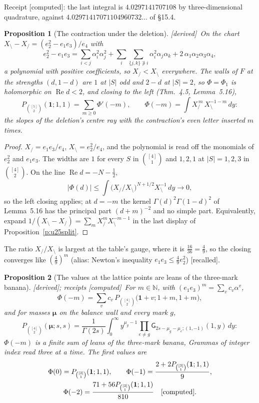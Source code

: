 \documentclass[11pt]{article}
\newcommand{\one}{\mathbf 1}
\newcommand{\bmu}{\boldsymbol\mu}
\newcommand{\sG}{\mathsf G}
\DeclareMathOperator{\re}{Re}
\theoremstyle{plain}
\newtheorem{proposition}{Proposition}[section]
\theoremstyle{definition}
\theoremstyle{remark}
\newcommand{\derived}{\textup{[derived]}}
\newcommand{\computed}{\textup{[computed]}}
\newcommand{\recalled}{\textup{[recalled]}}
\begin{document}
\noindent Receipt \computed: the last integral is $4.0297141707108$ by three-dimensional quadrature, against $4.02971417071104960732\ldots$ of \S15.4.

\begin{proposition}[The contraction under the deletion]\label{p:under}\derived\
On the chart $X_{\setminus}-X_{/}=(e_2^2-e_1e_3)/e_4$ with
\[
e_2^2-e_1e_3=\sum_{i<j}\alpha_i^2\alpha_j^2+\sum_i\sum_{\{j,k\}\not\ni i}\alpha_i^2\alpha_j\alpha_k+2\,\alpha_1\alpha_2\alpha_3\alpha_4,
\]
a polynomial with positive coefficients, so $X_{/}<X_{\setminus}$ everywhere. The walls of $F$ at the strengths $(d,1-d)$ are $1$ at $|S|$ odd and $2-d$ at $|S|=2$, so $\Phi=\Phi_1$ is holomorphic on $\re d<2$, and closing to the left (Thm.~4.5, Lemma~5.16),
\[
P_{\binom{[5]}2}(\one;1,1)=\sum_{m\ge0}\Phi'(-m),\qquad \Phi(-m)=\int X_{/}^{\,m}\,X_{\setminus}^{-1-m}\,dy :
\]
the slopes of the deletion's centre ray with the contraction's even letter inserted $m$ times.
\end{proposition}

\begin{proof}
$X_{/}=e_1e_3/e_4$, $X_{\setminus}=e_2^2/e_4$, and the polynomial is read off the monomials of $e_2^2$ and $e_1e_3$. The widths are $1$ for every $S$ in $\binom{[4]}1$ and $1,2,1$ at $|S|=1,2,3$ in $\binom{[4]}2$. On the line $\re d=-N-\frac12$,
\[
|\Phi(d)|\le\int\big(X_{/}/X_{\setminus}\big)^{N+1/2}X_{\setminus}^{-1}\,dy\to0,
\]
so the left closing applies; at $d=-m$ the kernel $\Gamma(d)^2\Gamma(1-d)^2$ of Lemma~5.16 has the principal part $(d+m)^{-2}$ and no simple part. Equivalently, expand $1/(X_{\setminus}-X_{/})=\sum_mX_{/}^mX_{\setminus}^{-m-1}$ in the last display of Proposition~\ref{p:u25split}.
\end{proof}

The ratio $X_{/}/X_{\setminus}$ is largest at the table's gauge, where it is $\frac{16}{36}=\frac49$, so the closing converges like $(\frac49)^m$ (alias: Newton's inequality $e_1e_3\le\frac49e_2^2$) \recalled.

\begin{proposition}[The values at the lattice points are leans of the three-mark banana]\label{p:leans}\derived; receipts \computed\
For $m\in\mathbb N$, with $(e_1e_3)^m=\sum_vc_v\alpha^v$,
\[
\Phi(-m)=\sum_vc_v\,P_{\binom{[4]}2}\big(\one+v;1+m,1+m\big),
\]
and for masses $\bmu$ on the balance wall and every mark $g$,
\[
P_{\binom{[4]}2}(\bmu;s,s)=\frac1{\Gamma(2s)}\int_0^\infty y^{\mu_g-1}\prod_{e\neq g}\sG_{2s-\mu_g-\mu_e;(1,-1)}(1,y)\,dy :
\]
$\Phi(-m)$ is a finite sum of leans of the three-mark banana, Grammas of integer index read three at a time. The first values are
\begin{gather*}
\Phi(0)=P_{\binom{[3]}1}(\one;1,1),\qquad \Phi(-1)=\frac{2+2P_{\binom{[3]}1}(\one;1,1)}9,\\
\Phi(-2)=\frac{71+56P_{\binom{[3]}1}(\one;1,1)}{810}\quad\computed .
\end{gather*}
\end{proposition}
\end{document}
